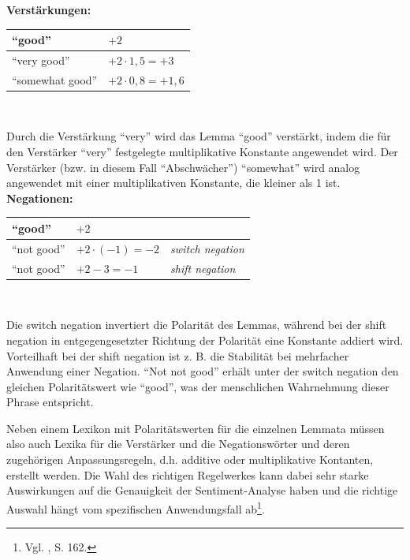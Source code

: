 \documentclass[
	a4paper,
	12pt,
	bibliography=totocnumbered,
	twoside,
]{scrreprt}
\begin{document}
\begin{Beispiel}
    \label{bsp:modifications}
    \textbf{Verstärkungen:}\smallskip
    
    \begin{tabular}{| p{4cm} | p{4cm} |}
        \hline
        "`good"' &  $+2$ \\ \hline
        "`very good"' & $+2 \cdot 1,5 = +3$ \\ \hline
        "`somewhat good"' & $+2 \cdot 0,8 = +1,6$ \\ \hline
    \end{tabular}\\
		\smallskip
		
			Durch die Verstärkung "`very"' wird das Lemma "`good"' verstärkt, indem die für den Verstärker "`very"' festgelegte multiplikative Konstante angewendet wird. Der Verstärker (bzw. in diesem Fall "`Abschwächer"') "`somewhat"' wird analog angewendet mit einer multiplikativen Konstante, die kleiner als 1 ist.\\
  
    \textbf{Negationen:}\smallskip
    
    \begin{tabular}{| p{4cm} | p{4cm} | p{4cm} |}
        \hline
        "`good"' &  $+2$ & \ \\ \hline
        "`not good"' & $+2 \cdot (-1) = -2$ & \textit{switch negation} \\ \hline
        "`not good"' & $+2 - 3 = -1$ & \textit{shift negation} \\ \hline
    \end{tabular}\\
		\smallskip
		
		Die switch negation invertiert die Polarität des Lemmas, während bei der shift negation in entgegengesetzter Richtung der Polarität eine Konstante addiert wird. Vorteilhaft bei der shift negation ist z. B. die Stabilität bei mehrfacher Anwendung einer Negation. "`Not not good"' erhält unter der switch negation den gleichen Polaritätswert wie "`good"', was der menschlichen Wahrnehmung dieser Phrase entspricht.\\
    
\end{Beispiel}

Neben einem Lexikon mit Polaritätswerten für die einzelnen Lemmata müssen also auch Lexika für die Verstärker und die Negationswörter und deren zugehörigen Anpassungsregeln, d.h. additive oder multiplikative Kontanten, erstellt werden. Die Wahl des richtigen Regelwerkes kann dabei sehr starke Auswirkungen auf die Genauigkeit der Sentiment-Analyse haben und die richtige Auswahl hängt vom spezifischen Anwendungsfall ab\footnote{Vgl. \citet{liu2009}, S. 162.}.\\
\end{document}
